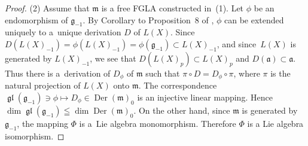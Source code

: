 \documentclass[pdftex]{sigma}
\numberwithin{equation}{section}
\numberwithin{theorem}{section}
\numberwithin{proposition}{section}
\numberwithin{lemma}{section}
\numberwithin{corollary}{section}
\numberwithin{definition}{section}
\numberwithin{example}{section}
\numberwithin{remark}{section}
\numberwithin{note}{section}
\newcommand{\gl}{\operatorname{\mathfrak{gl}}}
\newcommand{\Der}{\operatorname{Der}}
\begin{document}
\begin{proof}
(2) Assume that $\mathfrak m$ is a free FGLA
constructed in~(1).
Let $\phi$ be an endomorphism of $\mathfrak g_{-1}$.
By Corollary to Proposition~8 of \cite[Chapter~II, \S~2, no.~8]{bou72:1},
$\phi$ can be extended uniquely to a~unique derivation $D$ of $L(X)$.
Since $D(L(X)_{-1})=\phi(L(X)_{-1})=\phi(\mathfrak g_{-1})\subset L(X)_{-1}$,
and since~$L(X)$ is generated by $L(X)_{-1}$, we see that
$D(L(X)_{p})\subset L(X)_{p}$ and $D(\mathfrak a)\subset \mathfrak a$.
Thus there is a~derivation of $D_\phi$ of $\mathfrak m$ such that
$\pi\circ D=D_\phi\circ \pi$, where $\pi$ is the natural projection of $L(X)$ onto $\mathfrak m$.
The correspondence
$\gl(\mathfrak g_{-1})\ni\phi\mapsto D_\phi\in\Der(\mathfrak m)_0$
is an injective linear mapping.
Hence $\dim \gl(\mathfrak g_{-1})\leqq\dim \Der(\mathfrak m)_0$.
On the other hand, since $\mathfrak m$ is generated by $\mathfrak g_{-1}$,
the mapping $\Phi$ is a~Lie algebra monomorphism.
Therefore $\Phi$ is a Lie algebra isomorphism.
\end{proof}
\end{document}
